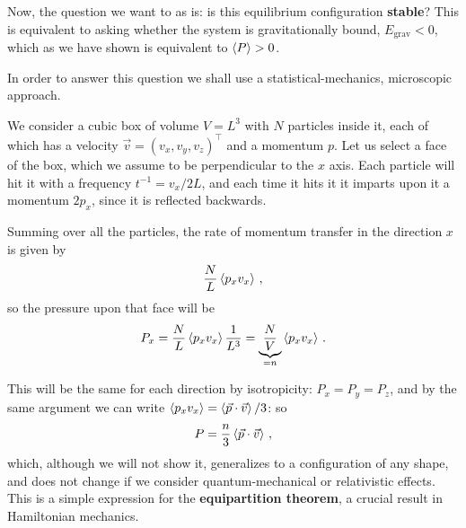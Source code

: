 \documentclass[main.tex]{subfiles}
\begin{document}

Now, the question we want to as is: is this equilibrium configuration \textbf{stable}? This is equivalent to asking whether the system is gravitationally bound, \(E _{\text{grav}} < 0\), which as we have shown is equivalent to \(\expval{P}> 0\).  

In order to answer this question we shall use a statistical-mechanics, microscopic approach. 

We consider a cubic box of volume \(V = L^3\) with \(N\) particles inside it, each of which has a velocity \(\vec{v} = (v_x, v_y, v_z)^{\top}\) and a momentum \(p\). Let us select a face of the box, which we assume to be perpendicular to the \(x\) axis. Each particle will hit it with a frequency \(t^{-1} = v_x / 2L\), and each time it hits it it imparts upon it a momentum \(2 p_x\), since it is reflected backwards.

Summing over all the particles, the rate of momentum transfer in the direction \(x\) is given by 
%
\begin{align}
  \frac{N}{L} \expval{p_x v_x}
\,,
\end{align}
%
so the pressure upon that face will be 
%
\begin{align}
P_x = \frac{N}{L} \expval{p_x v_x} \frac{1}{L^3} = \underbrace{\frac{N}{V}}_{= n} \expval{p_x v_x}
\,.
\end{align}

This will be the same for each direction by isotropicity: \(P_x = P_y = P_z\), and by the same argument we can write \(\expval{p_x v_x} = \expval{\vec{p} \cdot \vec{v}} / 3\): so 
%
\begin{align}
  P = \frac{n}{3} \expval{\vec{p} \cdot \vec{v}}
\,,
\end{align}
%
which, although we will not show it, generalizes to a configuration of any shape, and does not change if we consider quantum-mechanical or relativistic effects.
This is a simple expression for the \textbf{equipartition theorem}, a crucial result in Hamiltonian mechanics. 
\end{document}
